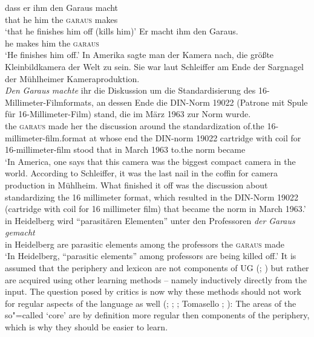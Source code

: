\eal
\ex 
\gll dass er ihm den Garaus macht\\
	 that he him the \textsc{garaus} makes\\
\glt `that he finishes him off (kills him)'
\ex 
\gll Er macht ihm den Garaus.\\
	 he makes him the \textsc{garaus}\\
\glt `He finishes him off.'
\ex
In Amerika sagte man der Kamera nach, die größte Kleinbildkamera der Welt zu sein. Sie war laut
Schleiffer am Ende der Sargnagel der Mühlheimer Kameraproduktion.\\
\gll 
\emph{Den} \emph{Garaus} \emph{machte} ihr die Diskussion um die Standardisierung des 16-Millimeter-Filmformats,
an dessen Ende die DIN-Norm 19022 (Patrone mit Spule für 16-Millimeter-Film) stand, die im März 1963
zur Norm wurde.\footnotemark\\
the \textsc{garaus} made her
the discussion around the standardization of.the 16-millimeter-film.format at whose end the DIN-norm 19022
\spacebr{}cartridge with coil for 16-millimeter-film stood that in March 1963 to.the norm
became\\
\glt `In America, one says that this camera was the biggest compact camera in the world. According to Schleiffer, it was the
last nail in the coffin for camera production in Mühlheim. What finished it off was the discussion about standardizing
the 16 millimeter format, which resulted in the DIN-Norm 19022 (cartridge with coil for 16 millimeter film) that became
the norm in March 1963.'
\ex
\gll in Heidelberg wird "`parasitären Elementen"' unter den Professoren \emph{der} \emph{Garaus} \emph{gemacht}\footnotemark\\
	 in Heidelberg are parasitic elements among the professors the \textsc{garaus} made\\
\glt `In Heidelberg, ``parasitic elements'' among professors are being killed off.'
\zl
\noindent
It is assumed that the periphery and lexicon are not components of UG (\citealp[--151]{Chomsky86}; \citealp[]{Fodor98a})
but rather are acquired using other learning methods -- namely inductively directly from the input. The question posed by critics is now why these methods should not work for regular aspects of the language as well (\citealp[]{Abney96a}; 
\citealp[]{Goldberg2003b}; \citealp[]{Newmeyer2005a}; Tomasello \citeyear[]{Tomasello2006a}; \citeyear[]{Tomasello2006c}): The areas of the so"=called `core' are by definition more regular then components of the periphery, which is why
they should be easier to learn.

